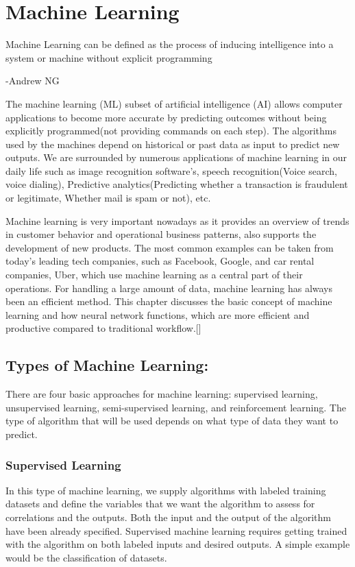 \chapter{\label{Method}Machine Learning}
\epigraph{Machine Learning can be defined as the process of inducing intelligence into a system or machine without explicit programming}{-Andrew NG}
The machine learning (ML) subset of artificial intelligence (AI) allows computer applications to become more accurate by predicting outcomes without being explicitly programmed(not providing commands on each step).  The algorithms used by the machines depend on historical or past data as input to predict new outputs. We are surrounded by numerous applications of machine learning in our daily life such as image recognition software's, speech recognition(Voice search, voice dialing), Predictive analytics(Predicting whether a transaction is fraudulent or legitimate, Whether mail is spam or not), etc.

Machine learning is very important nowadays as it provides an overview of trends in customer behavior and operational business patterns, also supports the development of new products. The most common examples can be taken from today's leading tech companies, such as Facebook, Google, and car rental companies, Uber, which use machine learning as a central part of their operations. For handling a large amount of data, machine learning has always been an efficient method. This chapter discusses the basic concept of machine learning and how neural network functions, which are more efficient and productive compared to traditional workflow.[\cite{25-26}]


\section{Types of Machine Learning:}
There are four basic approaches for machine learning: supervised learning, unsupervised learning, semi-supervised learning, and reinforcement learning. The type of algorithm that will be used depends on what type of data they want to predict.
\subsection{Supervised Learning}
In this type of machine learning, we supply algorithms with labeled training datasets and define the variables that we want the algorithm to assess for correlations and the outputs. 
Both the input and the output of the algorithm have been already specified. Supervised machine learning requires getting trained with the algorithm on both labeled inputs and desired outputs. A simple example would be the classification of datasets.
